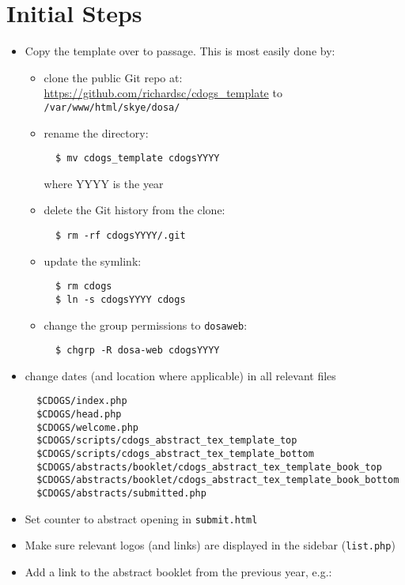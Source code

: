 \documentclass[letterpaper,12pt]{article}
\begin{document}
\section{Initial Steps}\label{s:initial}

\begin{itemize}
\item Copy the template over to passage. This is most easily done by:
  \begin{itemize}
  \item clone the public Git repo at: 
    \url{https://github.com/richardsc/cdogs_template} to \verb|/var/www/html/skye/dosa/|
  \item rename the directory:
\begin{verbatim}
  $ mv cdogs_template cdogsYYYY
\end{verbatim}
    where YYYY is the year
  \item delete the Git history from the clone:
\begin{verbatim}
  $ rm -rf cdogsYYYY/.git
\end{verbatim}
  \item update the symlink:
\begin{verbatim}
  $ rm cdogs
  $ ln -s cdogsYYYY cdogs
\end{verbatim}
  \item change the group permissions to \verb|dosaweb|:
\begin{verbatim}
  $ chgrp -R dosa-web cdogsYYYY
\end{verbatim}
  \end{itemize}
\item change dates (and location where applicable) in all relevant files
  \vspace{-1em}
\begin{verbatim}
  $CDOGS/index.php
  $CDOGS/head.php
  $CDOGS/welcome.php
  $CDOGS/scripts/cdogs_abstract_tex_template_top
  $CDOGS/scripts/cdogs_abstract_tex_template_bottom
  $CDOGS/abstracts/booklet/cdogs_abstract_tex_template_book_top
  $CDOGS/abstracts/booklet/cdogs_abstract_tex_template_book_bottom
  $CDOGS/abstracts/submitted.php
\end{verbatim}
\item Set counter to abstract opening in \verb|submit.html|
\item Make sure relevant logos (and links) are displayed in the
  sidebar (\verb|list.php|)
\item Add a link to the abstract booklet from the previous year, e.g.:
  \begin{itemize}

\end{itemize}
\end{itemize}
\end{document}
